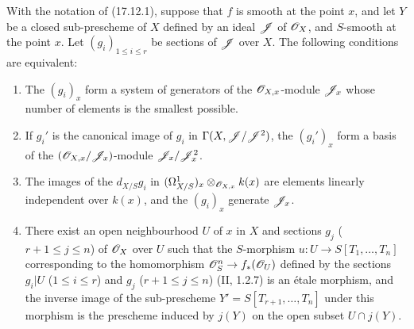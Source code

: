 \begin{corollary}[17.12.2]
\label{IV.17.12.2}
With the notation of (17.12.1), suppose that $f$ is smooth at the point $x$, and let $Y$ be a closed sub-prescheme of $X$ defined by an ideal $\mathscr{J}$ of $\mathscr{O}_X$, and $S$-smooth at the point $x$. Let $(g_i)_{1\leq i\leq r}$ be sections of $\mathscr{J}$ over $X$. The following conditions are equivalent:
\begin{enumerate}
  \item[a)] The $(g_i)_x$ form a system of generators of the $\mathscr{O}_{X,x}$-module $\mathscr{J}_x$ whose number of elements is the smallest possible.
  \item[b)] If $g_i'$ is the canonical image of $g_i$ in $\Gamma(X,\mathscr{J}/\mathscr{J}^2)$, the $(g_i')_x$ form a basis of the $(\mathscr{O}_{X,x}/\mathscr{J}_x)$-module $\mathscr{J}_x/\mathscr{J}_x^2$.


  \item[c)] The images of the $d_{X/S}g_i$ in $(\Omega^1_{X/S})_x\otimes_{\mathscr{O}_{X,x}}k(x)$ are elements linearly independent over $k(x)$, and the $(g_i)_x$ generate $\mathscr{J}_x$.
  \item[d)] There exist an open neighbourhood $U$ of $x$ in $X$ and sections $g_j$ ($r+1\leq j\leq n$) of $\mathscr{O}_X$ over $U$ such that the $S$-morphism $u:U\to S[T_1,\ldots,T_n]$ corresponding to the homomorphism $\mathscr{O}_S^n\to f_*(\mathscr{O}_U)$ defined by the sections $g_i|U$ ($1\leq i\leq r$) and $g_j$ ($r+1\leq j\leq n$) (II, 1.2.7) is an étale morphism, and the inverse image of the sub-prescheme $Y'=S[T_{r+1},\ldots,T_n]$ under this morphism is the prescheme induced by $j(Y)$ on the open subset $U\cap j(Y)$.
\end{enumerate}
\end{corollary}

